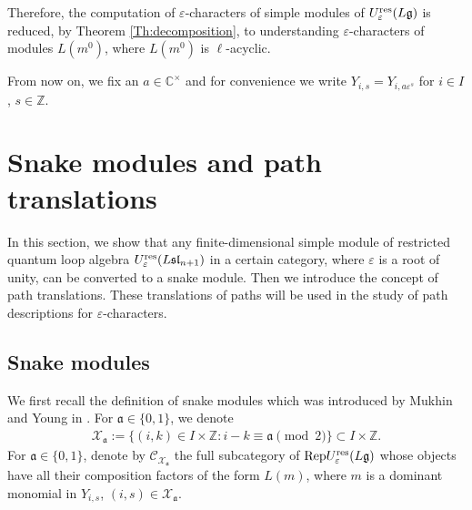 \documentclass[12pt, reqno]{amsart}
\numberwithin{equation}{section}
\newcommand{\res}{{\rm res}}
\begin{document}
{Therefore, the computation of $\varepsilon$-characters of simple modules of $U_\varepsilon^{\res}({L\mathfrak{g}})$ is reduced, by Theorem \ref{Th:decomposition}, to understanding $\varepsilon$-characters of modules $L(m^0)$, where $L(m^0)$ is $\ell$-acyclic.

From now on, we fix an $a\in \mathbb{C}^{\times}$ and for convenience we write $Y_{i,s}=Y_{i,a\varepsilon^s}$ for $i \in I$, $s \in \mathbb{Z}$.


\section{Snake modules and path translations} \label{sec:snake modules and three types of translations of paths}
In this section, we show that any finite-dimensional simple module of restricted quantum loop algebra $U_{\varepsilon}^{\res}({L\mathfrak{sl}_{n+1}})$ in a certain category, where $\varepsilon$ is a root of unity, can be converted to a snake module. Then we introduce the concept of path translations. These translations of paths will be used in the study of path descriptions for $\varepsilon$-characters.

\subsection{Snake modules }\label{Snake modules}
We first recall the definition of snake modules which was introduced by Mukhin and Young in \cite{MY12a}. For $\mathfrak{a} \in \{0,1\}$, we denote
\begin{align}\label{Eq:X_a}
\mathcal{X}_{\mathfrak{a}}:=\{(i,k)\in I \times \mathbb{Z}: i-k \equiv \mathfrak{a} \pmod 2\} \subset I \times \mathbb{Z}.
\end{align}
For $\mathfrak{a} \in \{0,1\}$, denote by $\mathcal{C}_{\mathcal{X}_{\mathfrak{a}}}$ the full subcategory of ${\rm Rep}U_\varepsilon^{\res}({L\mathfrak{g}})$ whose objects have
all their composition factors of the form $L(m)$, where $m$ is a dominant monomial in $Y_{i,s}$, $(i,s) \in \mathcal{X}_{\mathfrak{a}}$.

}
\end{document}
